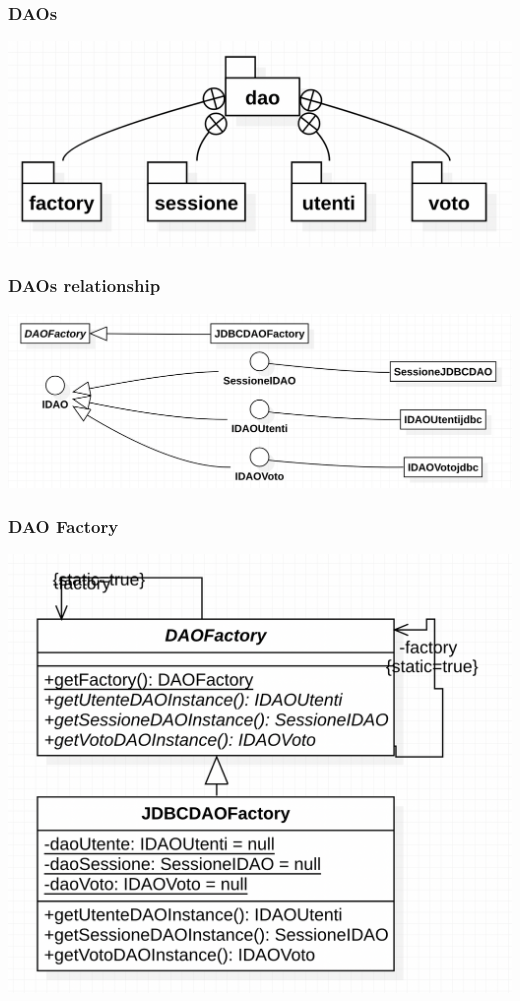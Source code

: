 \documentclass[11pt, oneside]{article}   	%
\begin{document}
\subsubsection{DAOs}
\begin{center}
\includegraphics[scale=0.7]{images/class4.png}
\end{center}

\subsubsection{DAOs relationship}
\begin{center}
\includegraphics[scale=0.5]{images/class3.png}
\end{center}

\subsubsection{DAO Factory}
\begin{center}
\includegraphics[scale=0.7]{images/class5.png}
\end{center}
\end{document}
